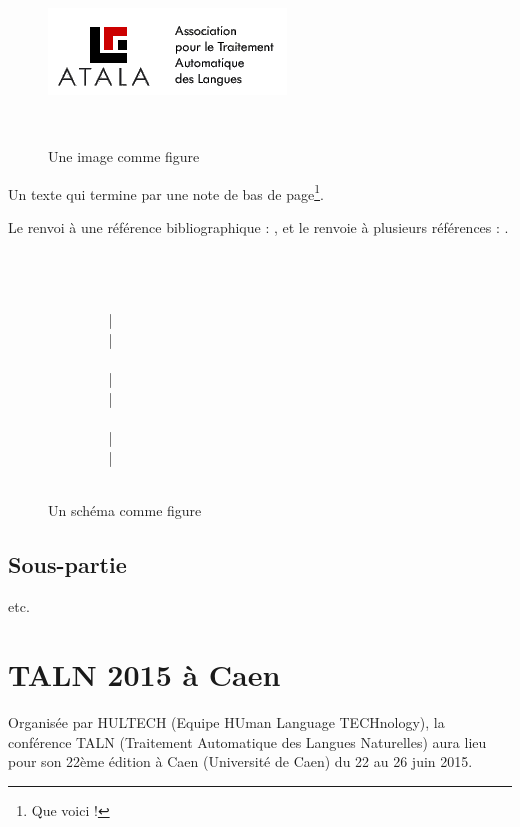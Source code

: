 \documentclass[10pt,a4paper,twoside]{article}
\begin{document}
\begin{figure}[htbp] 
\begin{center} 
\includegraphics{img/atala.png}
\end{center} 
\caption{Une image comme figure} \label{image} \
\end{figure}


Un texte qui termine par une note de bas de page\footnote{Que voici !}.

Le renvoi à une référence bibliographique : \cite{Bernhard07}, et le renvoie à plusieurs références : \cite{TALN2015,LanglaisPatry07}.

\begin{figure}[htbp] 
\begin{center} 
~\\
~\\
\\
 ~~~~~~~~ | \\
 ~~~~~~~~ | \\
\\
~~~~~~~~ | \\
~~~~~~~~ | \\
\\
~~~~~~~~ | \\
~~~~~~~~ | \\
\\

\end{center} 
\caption{Un schéma comme figure} \label{schema}
\end{figure}



\subsection{Sous-partie}

etc.


\section{TALN 2015 à Caen}

Organisée par HULTECH (Equipe HUman Language TECHnology), la conférence TALN (Traitement Automatique des Langues Naturelles) aura lieu pour son 22ème édition à Caen (Université de Caen) du 22 au 26 juin 2015. 
\end{document}
